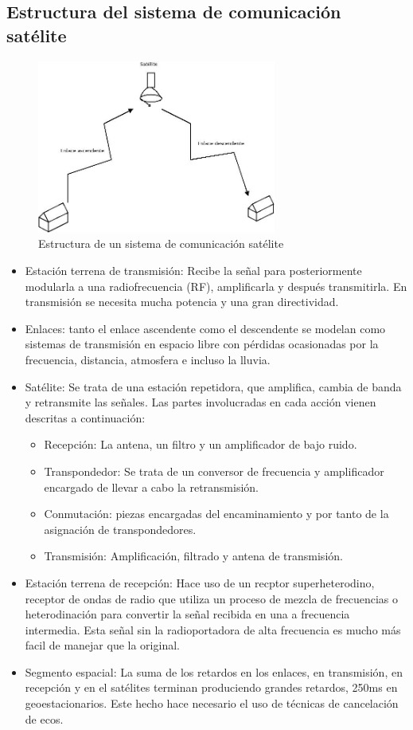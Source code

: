 	\subsection{Estructura del sistema de comunicación satélite}
	\label{sub:estructSat}
		\begin{figure}[htp]
			\centering
			\includegraphics[width=0.7\textwidth]{Imagen/arquisatelite.jpg}
			\caption{Estructura de un sistema de comunicación satélite}
		\end{figure}
		\begin{itemize}
			\item Estación terrena de transmisión: Recibe la señal para posteriormente modularla a una radiofrecuencia (RF), amplificarla y después transmitirla. En transmisión se necesita mucha potencia y una gran directividad.
			\item Enlaces: tanto el enlace ascendente como el descendente se modelan como sistemas de transmisión en espacio libre con pérdidas ocasionadas por la frecuencia, distancia, atmosfera e incluso la lluvia.
			\item Satélite: Se trata de una estación repetidora, que amplifica, cambia de banda y retransmite las señales. Las partes involucradas en cada acción vienen descritas a continuación:
			\begin{itemize}
				\item Recepción: La antena, un filtro y un amplificador de bajo ruido.
				\item Transpondedor: Se trata de un conversor de frecuencia y amplificador encargado de llevar a cabo la retransmisión.
				\item Conmutación: piezas encargadas del encaminamiento y por tanto de la asignación de transpondedores.
				\item Transmisión: Amplificación, filtrado y antena de transmisión.
			\end{itemize}
			\item Estación terrena de recepción: Hace uso de un recptor superheterodino, receptor de ondas de radio que utiliza un proceso de mezcla de frecuencias o heterodinación para convertir la señal recibida en una a frecuencia intermedia. Esta señal sin la radioportadora de alta frecuencia es mucho más facil de manejar que la original.
			\item Segmento espacial: La suma de los retardos en los enlaces, en transmisión, en recepción y en el satélites terminan produciendo grandes retardos, 250ms en geoestacionarios. Este hecho hace necesario el uso de técnicas de cancelación de ecos.
		\end{itemize}
